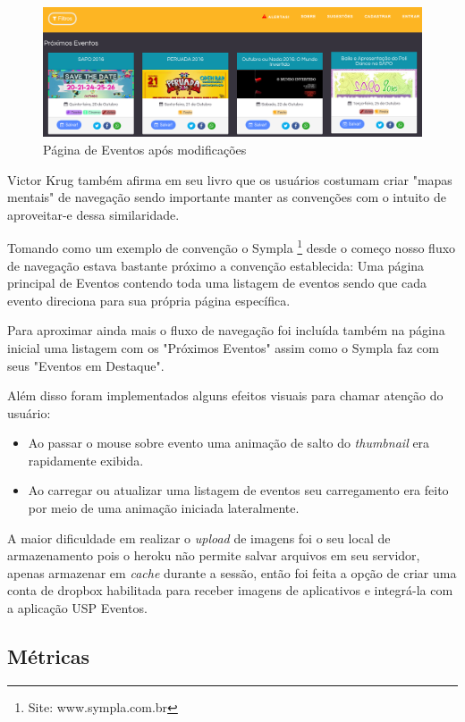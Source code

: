 \begin{figure}[htb]
\includegraphics[width=15cm]{figuras/events_page_3aiteracao}
\caption{\label{fig:events_page_3aiteracao} Página de Eventos após modificações}
\end{figure}
	\par Victor Krug também afirma em seu livro que os usuários costumam criar "mapas mentais" de navegação sendo importante manter as convenções com o intuito de aproveitar-e dessa similaridade.
	\par Tomando como um exemplo de convenção o Sympla \footnote{Site: www.sympla.com.br} desde o começo nosso fluxo de navegação estava bastante próximo a convenção establecida: Uma página principal de Eventos contendo toda uma listagem de eventos sendo que cada evento direciona para sua própria página específica.
	\par Para aproximar ainda mais o fluxo de navegação foi incluída também na página inicial uma listagem com os "Próximos Eventos" assim como o Sympla faz com seus "Eventos em Destaque".
	\par Além disso foram implementados alguns efeitos visuais para chamar atenção do usuário:
	\begin{itemize}
	\item Ao passar o mouse sobre evento uma animação de salto do \emph{thumbnail} era rapidamente exibida.
	\item Ao carregar ou atualizar uma listagem de eventos seu carregamento era feito por meio de uma animação iniciada lateralmente.
	\end{itemize}
	\par A maior dificuldade em realizar o \emph{upload} de imagens foi o seu local de armazenamento pois o heroku não permite salvar arquivos em seu servidor, apenas armazenar em \emph{cache} durante a sessão, então foi feita a opção de criar uma conta de dropbox habilitada para receber imagens de aplicativos e integrá-la com a aplicação USP Eventos.

\subsection{Métricas}

